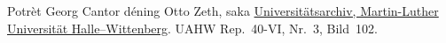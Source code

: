 Potrèt Georg Cantor déning Otto Zeth, saka
\href{http://www.archiv.uni-halle.de/}{Universit\"atsarchiv,
Martin-Luther Universit\"at Halle--Wittenberg}. UAHW Rep.~40-VI, Nr.~3,
Bild~102.
